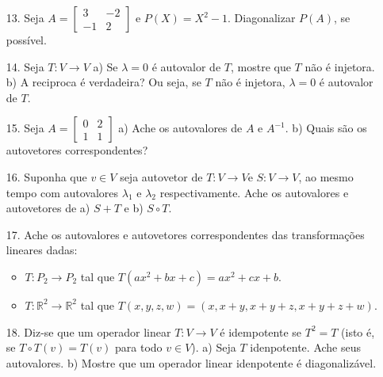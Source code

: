 \begin{itemize}
	\item [13.] Seja $A=\begin{bmatrix}
	3    & -2  \\
	-1     & 2  
	\end{bmatrix}$ e $P(X)=X^{2}-1$. Diagonalizar $P(A)$, se possível.
\end{itemize}
\begin{itemize}
	\item [14.] Seja $T:V \longrightarrow V $ a) Se $\lambda=0$ é autovalor de $T$, mostre que $T$ não é injetora. b) A reciproca é verdadeira? Ou seja, se $T$ não é injetora, $\lambda=0$ é autovalor de $T$.
\end{itemize}
\begin{itemize}
	\item [15.] Seja $A=\begin{bmatrix}
	0    & 2  \\
	1    & 1  
	\end{bmatrix}$ a) Ache os autovalores de $A$ e $A^{-1}$. b) Quais são os autovetores correspondentes?
\end{itemize}
\begin{itemize}
	\item [16.] Suponha que $v\in V$ seja autovetor de $T:V \longrightarrow V  $e $S:V \longrightarrow V $, ao mesmo tempo com autovalores $\lambda_{1}$ e $\lambda_{2}$ respectivamente. Ache os autovalores e autovetores de a) $S+T$ e b) $S\circ T$.
\end{itemize}
\begin{itemize}
	\item [17.] Ache os autovalores e autovetores correspondentes das transformações lineares dadas:
	 \begin{itemize}
	 	\item $T:P_{2}\rightarrow P_{2}$ tal que $ T(ax^{2}+bx+c)=ax^{2}+cx+b$.
	 	\item $T:\mathbb{R}^{2}\rightarrow \mathbb{R}^{2}$ tal que $ T(x,y,z,w)=(x,x+y,x+y+z,x+y+z+w)$.
	 \end{itemize}
\end{itemize}
\begin{itemize}
	\item [18.] Diz-se que um operador linear $T: V \rightarrow V$ é idempotente se $T^{2}=T$ (isto é, se $T\circ T(v)=T(v)$ para todo $v\in V$). a) Seja $T$ idenpotente. Ache seus autovalores. b) Mostre que um operador linear idenpotente é diagonalizável. 
\end{itemize}
